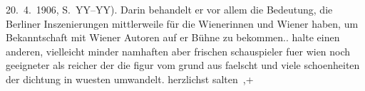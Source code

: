 \begin{ledgroupsized}[t]{13cm}
{{{                        20. 4. 1906, S. YY–YY). Darin behandelt
                  er vor allem die Bedeutung, die Berliner
                  Inszenierungen mittlerweile für die Wienerinnen
                  und Wiener haben, um Bekanntschaft mit Wiener Autoren auf er Bühne zu bekommen.}}}\label{K_L03420-1h}.
               halte einen anderen, vielleicht minder namhaften aber frischen schauspieler fuer {\pb}wien noch geeigneter als reicher der die figur vom grund aus faelscht und viele
               schoenheiten der dichtung in wuesten umwandelt.\pend
           \pstart herzlichst \spacefill\mbox{salten ,+}\pend{}
         
         \endnumbering{}\end{ledgroupsized}\begin{anhang}\end{anhang}\newcommand{\dateiname}{L03420}\newcommand{\titel}{Felix Salten an Arthur Schnitzler, 21. 4. [1906]}\newcommand{\editorInnen}{Martin Anton Müller und Laura Untner}
      
